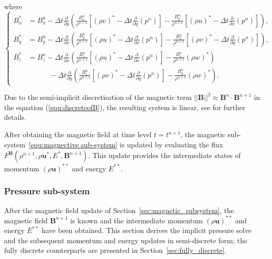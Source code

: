 \documentclass[a4paper,fleqn]{cas-sc}
\theoremstyle{definition}
\theoremstyle{remark}
\begin{document}
where
\begin{equation}
    \left\{ 
    \begin{aligned}
    B_x^* &= B_x^n - \Delta t \frac{\partial}{\partial y} (\frac{B_x^n}{\rho ^{n+1}}[(\rho v) ^ * - \Delta t\frac{\partial}{\partial y} (p^n)] - \frac{B_y^n}{\rho^{n+1}}[(\rho u)^* - \Delta t \frac{\partial}{\partial x}(p^n)]),\\
    B_y^* &= B_y^n - \Delta t \frac{\partial}{\partial x} (\frac{B_y^n}{\rho ^{n+1}}[(\rho u) ^ * - \Delta t\frac{\partial}{\partial x} (p^n)] - \frac{B_x^n}{\rho^{n+1}}[(\rho v)^* - \Delta t \frac{\partial}{\partial y}(p^n)]), \\
    B_z^* &= B_z^n - \Delta t \frac{\partial}{\partial x} (\frac{B_z^n}{\rho ^{n+1}}[(\rho u) ^ * - \Delta t\frac{\partial}{\partial x} (p^n)] - \frac{B_x^n}{\rho^{n+1}}(\rho w)^*)\\
    & \quad \quad \quad -\Delta t \frac{\partial}{\partial y} (\frac{B_z^n}{\rho ^{n+1}}[(\rho v) ^ * - \Delta t\frac{\partial}{\partial y} (p^n)] - \frac{B_y^n}{\rho^{n+1}}(\rho w)^*).
    \end{aligned}
    \right.
\end{equation}

Due to the semi-implicit discretisation of the magnetic term $||\mathbf{B}||^2 \approx \mathbf{B}^n \cdot \mathbf{B}^{n+1}$ in the equation (\ref{equ:discreteofB}), the resulting system is linear, see \cite{BoscheriThomann2024} for further details.

After obtaining the magnetic field at time level $t = t^{n+1}$,
the magnetic sub-system~\eqref{equ:magnective sub-system} is updated by evaluating the flux
$F^{\mathbf{B}}(\rho^{n+1}, \rho \mathbf{u}^{*}, E^{*}, \mathbf{B}^{n+1})$.
This update provides the intermediate states of momentum $(\rho \mathbf{u})^{**}$ and energy $E^{**}$.



\subsubsection{Pressure sub-system}
\label{sec:pressure}

After the magnetic field update of Section~\ref{sec:magnetic_subsystem}, the magnetic field
$\mathbf{B}^{n+1}$ is known and the intermediate momentum $(\rho\mathbf{u})^{**}$
and energy $E^{**}$ have been obtained. This section derives the implicit pressure
solve and the subsequent momentum and energy updates in semi-discrete form; the
fully discrete counterparts are presented in Section~\ref{sec:fully_discrete}.
\end{document}
